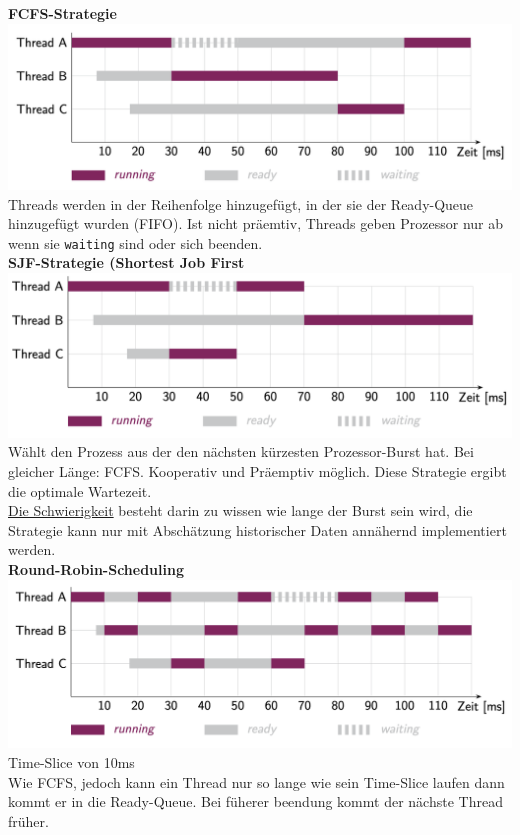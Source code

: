 \documentclass[8pt]{extarticle}
\let\oldtextbf\textbf
\renewcommand{\textbf}{\tiny\oldtextbf}
\begin{document}
\begin{multicols*}{5}
	\textbf{FCFS-Strategie}\\
	\includegraphics[scale=0.29]{FCFS_Scheduling.png}
	Threads werden in der Reihenfolge hinzugefügt, in der sie der Ready-Queue hinzugefügt wurden (FIFO). Ist nicht präemtiv, Threads geben Prozessor nur ab wenn sie \texttt{waiting} sind oder sich beenden.\\
	
	\textbf{SJF-Strategie (Shortest Job First}\\
	\includegraphics[scale=0.29]{SJF_Scheduling.png}
	Wählt den Prozess aus der den nächsten kürzesten Prozessor-Burst hat. Bei gleicher Länge: FCFS. Kooperativ und Präemptiv möglich.
	Diese Strategie ergibt die optimale Wartezeit.\\
	\underline{Die Schwierigkeit} besteht darin zu wissen wie lange der Burst sein wird, die Strategie kann nur mit Abschätzung historischer Daten annähernd implementiert werden.\\
	
	\textbf{Round-Robin-Scheduling}\\
	\includegraphics[scale=0.29]{RR_Scheduling.png}\\Time-Slice von 10ms\\
	Wie FCFS, jedoch kann ein Thread nur so lange wie sein Time-Slice laufen dann kommt er in die Ready-Queue. Bei füherer beendung kommt der nächste Thread früher.\\
	

\end{multicols*}
\end{document}

